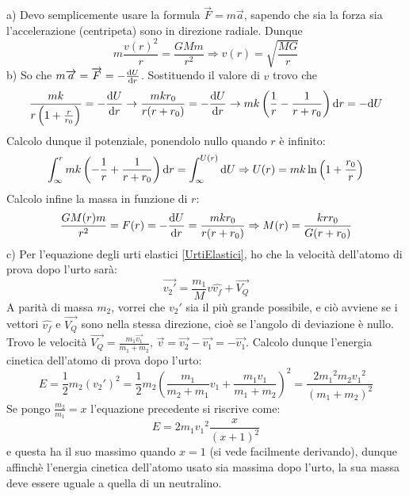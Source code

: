 \documentclass[../main.tex]{subfiles}
\begin{document}
\solution
a) Devo semplicemente usare la formula $\overrightarrow F = m\overrightarrow a$, sapendo che sia la forza sia l'accelerazione (centripeta) sono in direzione radiale. Dunque
\begin{equation}
 m\frac{v(r)^2}{r} = \frac{GMm}{r^2} \Rightarrow v(r) = \sqrt{\frac{MG}{r}}
\end{equation}
b) So che $m\overrightarrow a = \overrightarrow F = -\frac{\mathrm{d} U}{\mathrm{d} r}$. Sostituendo il valore di $v$ trovo che
\begin{equation}
  \frac{mk}{r\left ( 1+\frac{r}{r_0}\right )} = -\frac{\mathrm{d} U}{\mathrm{d} r} \rightarrow 
\frac{mkr_0}{r(r+r_0)} = -\frac{\mathrm{d} U}{\mathrm{d} r} \rightarrow mk\left ( \frac{1}{r} - \frac{1}{r+r_0}\right ) \mathrm{d} r = -\mathrm{d} U
\end{equation}
Calcolo dunque il potenziale, ponendolo nullo quando $r$ è infinito:
\begin{equation}
 \int_{\infty}^{r} mk\left ( -\frac{1}{r} + \frac{1}{r+r_0}\right ) \mathrm{d} r = \int_{\infty}^{U(r)} \mathrm{d} U \Rightarrow
 U(r) = mk \ln \left ( 1 + \frac{r_0}{r}\right )
\end{equation}
Calcolo infine la massa in funzione di $r$: 
\begin{equation}
 \frac{GM(r)m}{r^2} = F(r) = -\frac{\mathrm{d} U}{\mathrm{d} r} = \frac{mkr_0}{r(r+r_0)} \Rightarrow 
 M(r) = \frac{krr_0}{G(r+r_0)}
\end{equation}
c) Per l'equazione degli urti elastici \cref{UrtiElastici}, ho che la velocità dell'atomo di prova dopo l'urto sarà:
\begin{equation*}
 \overrightarrow {{v_2}'} = \frac{m_1}{M}v\hat{v_f}+\overrightarrow {V_Q}
\end{equation*}
A parità di massa $m_2$, vorrei che ${v_2}'$ sia il più grande possibile, e ciò avviene se i vettori $\hat{v_f}$ e $\overrightarrow {V_Q}$ sono nella stessa direzione, cioè se l'angolo di deviazione è nullo.
Trovo le velocità $\overrightarrow {V_Q} = \frac{m_1\overrightarrow {v_1}}{m_1+m_2}$, $\overrightarrow v = \overrightarrow {v_2}-\overrightarrow {v_1} = -\overrightarrow {v_1}$. Calcolo dunque l'energia cinetica dell'atomo di prova dopo l'urto:
$$ E = \frac{1}{2}m_2\left ( {v_2}'\right )^2 = \frac{1}{2} m_2 \left ( \frac{m_1}{m_2+m_1}v_1+\frac{m_1v_1}{m_1+m_2}\right )^2 = \frac{2{m_1}^2m_2{v_1}^2}{\left (m_1+m_2\right )^2} $$
Se pongo $\frac{m_2}{m_1} = x$ l'equazione precedente si riscrive come:
$$ E = 2m_1{v_1}^2\frac{x}{\left ( x+1\right )^2} $$ e questa ha il suo massimo quando $x = 1$ (si vede facilmente derivando), dunque affinchè l'energia cinetica dell'atomo usato sia massima dopo l'urto, la sua massa deve essere uguale a quella di un neutralino.
\end{document}
